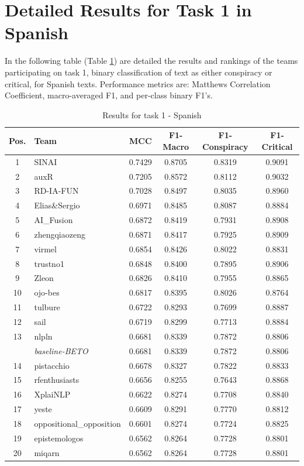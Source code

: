 \documentclass{Configuration_Files/PoliMi3i_thesis}
\begin{document}
\section{Detailed Results for Task 1 in Spanish}
In the following table (Table \ref{tab:task1_results_es_full}) are detailed the results and rankings of the teams participating on task 1, binary classification of text as either conspiracy or critical, for Spanish texts. Performance metrics are: Matthews Correlation Coefficient, macro-averaged F1, and per-class binary F1’s.

\begin{table}[H]
\centering
\small
\renewcommand{\arraystretch}{0.8} %
\begin{tabular}{clcccc}
\hline
\textbf{Pos.} & \textbf{Team} & \textbf{MCC} & \textbf{F1-Macro} & \textbf{F1-Conspiracy} & \textbf{F1-Critical} \\ \hline
1 & SINAI & 0.7429 & 0.8705 & 0.8319 & 0.9091 \\
2 & auxR & 0.7205 & 0.8572 & 0.8112 & 0.9032 \\
3 & RD-IA-FUN & 0.7028 & 0.8497 & 0.8035 & 0.8960 \\
4 & Elias\&Sergio & 0.6971 & 0.8485 & 0.8087 & 0.8884 \\
5 & AI\_Fusion & 0.6872 & 0.8419 & 0.7931 & 0.8908 \\
6 & zhengqiaozeng & 0.6871 & 0.8417 & 0.7925 & 0.8909 \\
7 & virmel & 0.6854 & 0.8426 & 0.8022 & 0.8831 \\
8 & trustno1 & 0.6848 & 0.8400 & 0.7895 & 0.8906 \\
9 & Zleon & 0.6826 & 0.8410 & 0.7955 & 0.8865 \\
10 & ojo-bes & 0.6817 & 0.8395 & 0.8026 & 0.8764 \\
11 & tulbure & 0.6722 & 0.8293 & 0.7699 & 0.8887 \\
12 & sail & 0.6719 & 0.8299 & 0.7713 & 0.8884 \\
13 & nlpln & 0.6681 & 0.8339 & 0.7872 & 0.8806 \\
& \textit{baseline-BETO} & 0.6681 & 0.8339 & 0.7872 & 0.8806 \\
14 & pistacchio & 0.6678 & 0.8327 & 0.7822 & 0.8833 \\
15 & rfenthusiasts & 0.6656 & 0.8255 & 0.7643 & 0.8868 \\
16 & XplaiNLP & 0.6622 & 0.8274 & 0.7708 & 0.8840 \\
17 & yeste & 0.6609 & 0.8291 & 0.7770 & 0.8812 \\
18 & oppositional\_opposition & 0.6601 & 0.8274 & 0.7724 & 0.8825 \\
19 & epistemologos & 0.6562 & 0.8264 & 0.7728 & 0.8801 \\
20 & miqarn & 0.6562 & 0.8264 & 0.7728 & 0.8801 \\
\hline
\end{tabular}
\caption{\small Results for task 1 - Spanish \cite{korencic2024oppositional}}
\label{tab:task1_results_es_full}
\end{table}
\end{document}
